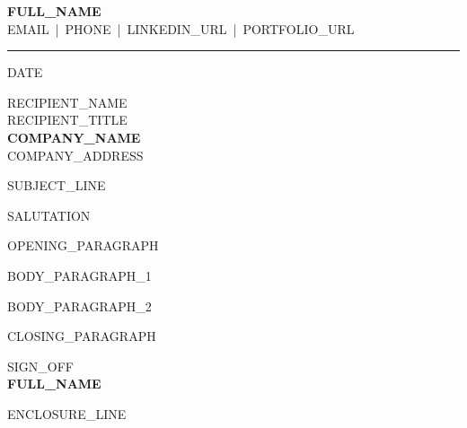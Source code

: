 \documentclass[a4paper,11pt]{article}
\begin{document}
\begin{center}
  \textbf{\Huge {{FULL_NAME}}}\\
  {{EMAIL}} \,|\, {{PHONE}} \,|\, {{LINKEDIN_URL}} \,|\, {{PORTFOLIO_URL}}
\end{center}
\rule{\textwidth}{0.5pt}

\vspace{1em}
{{DATE}}

\vspace{1em}
{{RECIPIENT_NAME}}\\
{{RECIPIENT_TITLE}}\\
\textbf{{{COMPANY_NAME}}}\\
{{COMPANY_ADDRESS}}

\vspace{1em}
{{SUBJECT_LINE}}

\vspace{1em}
{{SALUTATION}}

{{OPENING_PARAGRAPH}}

{{BODY_PARAGRAPH_1}}

{{BODY_PARAGRAPH_2}}

{{CLOSING_PARAGRAPH}}

\vspace{1.5em}
{{SIGN_OFF}}\\[2em]
\textbf{{{FULL_NAME}}}

\vspace{2em}
{{ENCLOSURE_LINE}}
\end{document}
